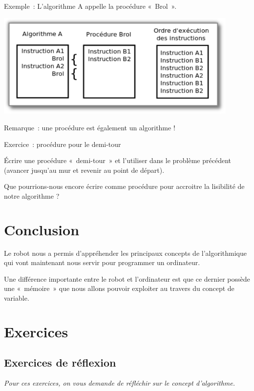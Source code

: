 	Exemple~: L'algorithme A appelle la procédure «~Brol~».

	\begin{center}
	\includegraphics[width=0.9\textwidth]{image/robot-procedure}
	
	{Remarque~: une procédure est également un algorithme !}
	\end{center}

	
	\begin{Emphase}[exercice]{Exercice~: procédure pour le demi-tour}
	
		Écrire une procédure «~demi-tour~» et l'utiliser dans
		le problème précédent (avancer jusqu'au mur et revenir
		au point de départ).
		
		Que pourrions-nous encore écrire comme procédure pour accroitre
		la lisibilité de notre algorithme ?

	\end{Emphase}

\section{Conclusion}

	Le robot nous a permis d'appréhender les principaux
	concepts de l'algorithmique qui vont maintenant nous
	servir pour programmer un ordinateur. 
	
	Une différence importante entre le robot et
	l'ordinateur est que ce dernier possède une
	«~mémoire~» que nous allons pouvoir exploiter au travers du concept de
	variable.

\section{Exercices}

	\subsection{Exercices de réflexion}

		\textit{
		Pour ces exercices, on vous demande de réfléchir sur le concept
		d'algorithme.}

